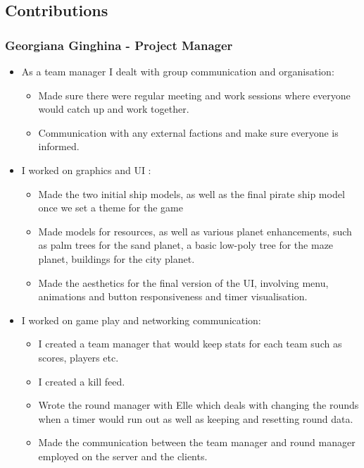 \documentclass[11pt,a4paper]{article}
\begin{document}
        \pagebreak

        \subsection{Contributions}
        \subsubsection{Georgiana Ginghina - Project Manager }
        \begin{itemize}
          \item As a team manager I dealt with group communication and organisation:
          \begin{itemize}
            \item Made sure there were regular meeting and work sessions where everyone would catch up and work together.
            \item Communication with any external factions and make sure everyone is informed.
          \end{itemize}
          \item I worked on graphics and UI :
          \begin{itemize}
            \item Made the two initial ship models, as well as the final pirate ship model once we set a theme for the game
            \item Made models for resources, as well as various planet enhancements, such as palm trees for the sand planet, a basic low-poly tree for the maze planet, buildings for the city planet.
            \item Made the aesthetics for the final version of the UI, involving menu, animations and button responsiveness and timer visualisation. 
          \end{itemize}
          \item I worked on game play and networking communication:
          \begin{itemize}
            \item I created a team manager that would keep stats for each team such as scores, players etc.
            \item I created a kill feed.
            \item Wrote the round manager with Elle which deals with changing the rounds when a timer would run out as well as keeping and resetting round data.
            \item Made the communication between the team manager and round manager employed on the server and the clients.

\end{itemize}
\end{itemize}
\end{document}
